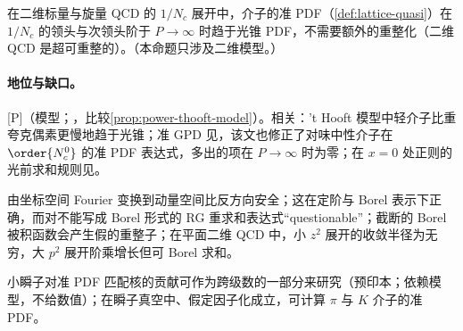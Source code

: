 \begin{proposition}\label{prop:yzliu-2dqcd}
在二维标量与旋量 QCD 的 $1/N_c$ 展开中，介子的准 PDF（\cref{def:lattice-quasi}）在 $1/N_c$ 的领头与次领头阶于 $P\to\infty$ 时趋于光锥 PDF，不需要额外的重整化（二维 QCD 是超可重整的）。（本命题只涉及二维模型。）
\end{proposition}

\paragraph{地位与缺口。}[P]（模型；\cite{Ji:2018waw}，比较\cref{prop:power-thooft-model}）。相关：'t Hooft 模型中轻介子比重夸克偶素更慢地趋于光锥\cite{Jia:2018qee}；准 GPD 见\cite{Jia:2024atq}，该文也修正了\cite{Jia:2018qee}对味中性介子在 $\order{N_c^0}$ 的准 PDF 表达式，多出的项在 $P\to\infty$ 时为零；在 $x=0$ 处正则的光前求和规则见\cite{Ji:2020bby}。

\begin{remark}[坐标空间与动量空间之间变换的教训]\label{rem:yzliu-transforms}
由坐标空间 Fourier 变换到动量空间比反方向安全；这在定阶与 Borel 表示下正确，而对不能写成 Borel 形式的 RG 重求和表达式“questionable”；截断的 Borel 被积函数会产生假的重整子；在平面二维 QCD 中，小 $z^2$ 展开的收敛半径为无穷，大 $p^2$ 展开阶乘增长但可 Borel 求和\cite[第~6~节]{Liu:2024omb}。
\end{remark}

\begin{remark}[瞬子与模型研究]\label{rem:yzliu-instantons}
小瞬子对准 PDF 匹配核的贡献可作为跨级数的一部分来研究\cite{Liu:2021evw}（预印本；依赖模型，不给数值）；在瞬子真空中、假定因子化成立，可计算 $\pi$ 与 $K$ 介子的准 PDF\cite{Kock:2020frx}。
\end{remark}
